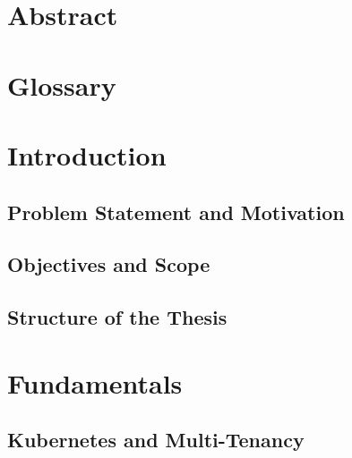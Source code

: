 \documentclass[11pt, a4paper, oneside, draft]{scrartcl}
\begin{document}
\begin{titlepage}
    \end{titlepage}

    \restoregeometry


    \section*{Abstract}

    \begingroup
        \tableofcontents
    \endgroup

    \section*{Glossary}


    \section{Introduction}

        \subsection{Problem Statement and Motivation}



        \subsection{Objectives and Scope}

        \subsection{Structure of the Thesis}

    \section{Fundamentals}

        \subsection{Kubernetes and Multi-Tenancy}
\end{document}
